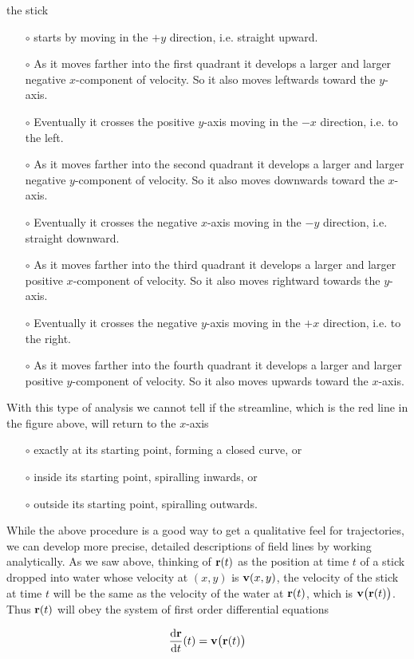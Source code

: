 \begin{eg}
\noindent the stick 
\begin{itemize}\itemsep1pt \parskip0pt  %
\item[$\circ$]
starts by moving in the $+y$ direction, i.e. straight upward.
\item[$\circ$]
As it moves farther into the first quadrant it develops
a larger and larger negative $x$-component of velocity.
So it also moves leftwards toward the $y$-axis.  
\item[$\circ$]
Eventually it crosses the positive $y$-axis moving in the $-x$ direction,
i.e. to the left.
\item[$\circ$]
As it moves farther into the second quadrant it develops
a larger and larger negative $y$-component of velocity.
So it also moves downwards toward the $x$-axis.
\item[$\circ$]
Eventually it crosses the negative $x$-axis moving in the $-y$ direction, 
i.e. straight downward.
\item[$\circ$]
As it moves farther into the third quadrant it develops
a larger and larger positive $x$-component of velocity.
So it also moves rightward towards the $y$-axis.
\item[$\circ$]
Eventually it crosses the negative $y$-axis moving in the $+x$ direction,
i.e. to the right.
\item[$\circ$]
As it moves farther into the fourth quadrant it develops
a larger and larger positive $y$-component of velocity.
So it also moves upwards toward the $x$-axis.
\end{itemize}
With this type of analysis we cannot tell if the streamline, which is the red 
line in the figure above, will return to the $x$-axis 
\begin{itemize}\itemsep1pt \parskip0pt  %
\item[$\circ$]
exactly at its starting point, forming a closed curve, or
\item[$\circ$]
inside its starting point, spiralling inwards, or
\item[$\circ$]
outside its starting point, spiralling outwards.
\end{itemize}
\end{eg}

While the above procedure is a good way to get a qualitative feel 
for trajectories,
we can develop more precise, detailed descriptions of field lines by
working analytically. As we saw above, thinking of $\mathbf{r}(t)$ as the position
at time $t$ of a stick dropped into water whose velocity at $(x,y)$ is $\mathbf{v}(x,y)$, the velocity of the stick at time $t$ will be the same 
as the velocity of the  water at $\mathbf{r}(t)$, which is $\mathbf{v}\big(\mathbf{r}(t)\big)$. 
Thus $\mathbf{r}(t)$ will obey the system of first order differential equations
\begin{impeqn}\label{eq:VFstreamLineA}
\begin{equation*}
\diff{\vr}{t}(t) = \vv\big(\vr(t)\big) 
\end{equation*}
\end{impeqn}


